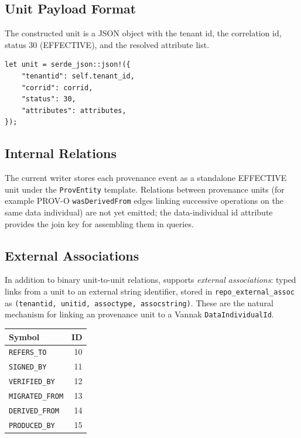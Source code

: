 \subsection{Unit Payload Format}

The constructed unit is a JSON object with the tenant id, the correlation id,
status 30 (EFFECTIVE), and the resolved attribute list.

\begin{lstlisting}
let unit = serde_json::json!({
    "tenantid": self.tenant_id,
    "corrid": corrid,
    "status": 30,
    "attributes": attributes,
});
\end{lstlisting}

\subsection{Internal Relations}

The current writer stores each provenance event as a standalone EFFECTIVE unit
under the \texttt{ProvEntity} template. Relations between provenance units (for
example PROV-O \texttt{wasDerivedFrom} edges linking successive operations on
the same data individual) are not yet emitted; the data-individual id attribute
provides the join key for assembling them in queries.

\subsection{External Associations}

In addition to binary unit-to-unit relations, \ipto{} supports \textit{external
associations}: typed links from a unit to an external string identifier, stored
in \texttt{repo\_external\_assoc} as \texttt{(tenantid, unitid, assoctype,
assocstring)}. These are the natural mechanism for linking an \ipto{} provenance
unit to a Vannak \texttt{DataIndividualId}.

\begin{longtable}{lr}
\hline
Symbol & ID \\
\hline
\texttt{REFERS\_TO}      & 10 \\
\texttt{SIGNED\_BY}      & 11 \\
\texttt{VERIFIED\_BY}    & 12 \\
\texttt{MIGRATED\_FROM}  & 13 \\
\texttt{DERIVED\_FROM}   & 14 \\
\texttt{PRODUCED\_BY}    & 15 \\
\hline
\end{longtable}

